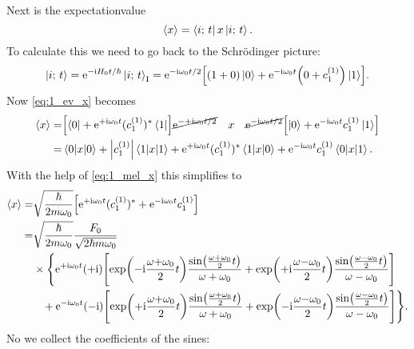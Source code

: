 \documentclass[11pt,letter, swedish, english
]{article}
\begin{document}
Next is the expectationvalue
\begin{equation}\label{eq:1_ev_x}
\ev{x}=\bra{i;\,t}x\ket{i;\,t}.
\end{equation}
To calculate this we need to go back to the Schrödinger picture:
\begin{equation}
\ket{i;\,t}=\mathrm{e}^{-\mathrm{i} H_0t/\hbar}\ket{i;\,t}_{\text{I}}
=\mathrm{e}^{-\mathrm{i}\omega_0t/2}\qty[
(1+0)\ket{0} + \mathrm{e}^{-\mathrm{i}\omega_0t}\qty(0+c_1^{(1)})\ket{1}].
\end{equation}
Now \eqref{eq:1_ev_x} becomes
\begin{equation}
\begin{aligned}
\ev{x}=&
\qty[\bra{0} + \ee^{+\ii\omega_0t}(c_1^{(1)})^*\bra{1}]
\cancel{\ee^{-+\ii\omega_0t/2}}
\quad x \quad
\cancel{\ee^{-\ii\omega_0t/2}}\qty[
\ket{0} + \ee^{-\ii\omega_0t}c_1^{(1)}\ket{1}]\\
=&\mel{0}{x}{0}+\abs{c_1^{(1)}}\mel{1}{x}{1}
+\ee^{+\ii\omega_0t}(c_1^{(1)})^*\mel{1}{x}{0}
+\ee^{-\ii\omega_0t}c_1^{(1)}\mel{0}{x}{1}.
\end{aligned}
\end{equation}
With the help of \eqref{eq:1_mel_x} this simplifies to
\begin{equation}
\begin{aligned}
\ev{x}=&\sqrt{\frac{\hbar}{2m\omega_0}}
\qty[\ee^{+\ii\omega_0t}(c_1^{(1)})^*
+\ee^{-\ii\omega_0t}c_1^{(1)}]\\
=&\sqrt{\frac{\hbar}{2m\omega_0}}
\frac{ F_0}{\sqrt{2\hbar m\omega_0}}\\
&\times\Bigg\{
\ee^{+\ii\omega_0t}(+\ii)\qty[
\exp(-\ii\frac{\omega{+}\omega_0}{2}t)\frac{\sin(\frac{\omega+\omega_0}{2}t)}
{\omega+\omega_0}
+\exp(+\ii\frac{\omega{-}\omega_0}{2}t)\frac{\sin(\frac{\omega-\omega_0}{2}t)}
{\omega-\omega_0}
] \\ & \hspace{8.5pt}
+\ee^{-\ii\omega_0t}(-\ii)\qty[
\exp(+\ii\frac{\omega{+}\omega_0}{2}t)\frac{\sin(\frac{\omega+\omega_0}{2}t)}
{\omega+\omega_0}
+\exp(-\ii\frac{\omega{-}\omega_0}{2}t)\frac{\sin(\frac{\omega-\omega_0}{2}t)}
{\omega-\omega_0}
]
\Bigg\}.
\end{aligned}
\end{equation}
No we collect the coefficients of the sines:
\end{document}
